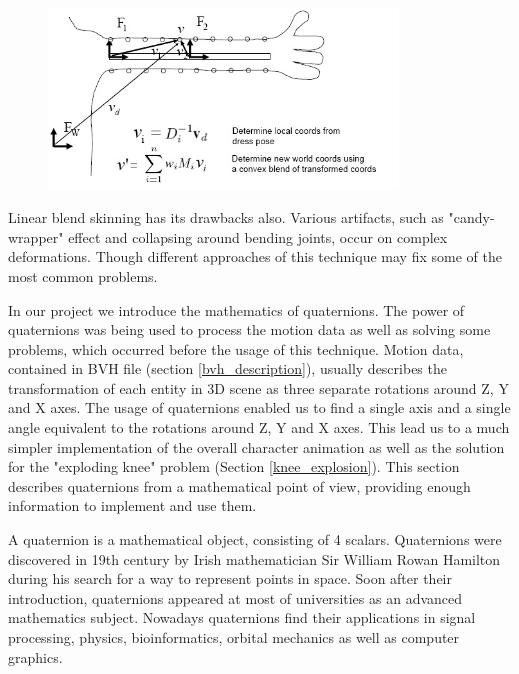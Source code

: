 \documentclass[times, 10pt,twocolumn]{article}
\begin{document}
\begin{figure}[H]
  \caption{}
  \centering
  \includegraphics[width=93mm]{images/hand2.jpg}
\end{figure}

Linear blend skinning has its drawbacks also. Various artifacts, such as "candy-wrapper" effect and collapsing around bending joints, occur on complex deformations. Though different approaches of this technique may fix some of the most common problems.

\label{Quaternions}
In our project we introduce the mathematics of quaternions. The power of quaternions was being used to process the motion data as well as solving some problems, which occurred before the usage of this technique. Motion data, contained in BVH file (section \ref{bvh_description}), usually describes the transformation of each entity in 3D scene as three separate rotations around Z, Y and X axes. The usage of quaternions enabled us to find a single axis and a single angle equivalent to the rotations around Z, Y and X axes.  This lead us to a much simpler implementation of the overall character animation as well as the solution for the "exploding knee" problem (Section \ref{knee_explosion}). This section describes quaternions from a mathematical point of view, providing enough information to implement and use them.

A quaternion is a mathematical object, consisting of 4 scalars. Quaternions were discovered in 19th century by Irish mathematician Sir William Rowan Hamilton during his search for a way to represent points in space.  Soon after their introduction, quaternions appeared at most of universities as an advanced mathematics subject. Nowadays quaternions find their applications in signal processing, physics, bioinformatics, orbital mechanics as well as computer graphics.
	
\end{document}
